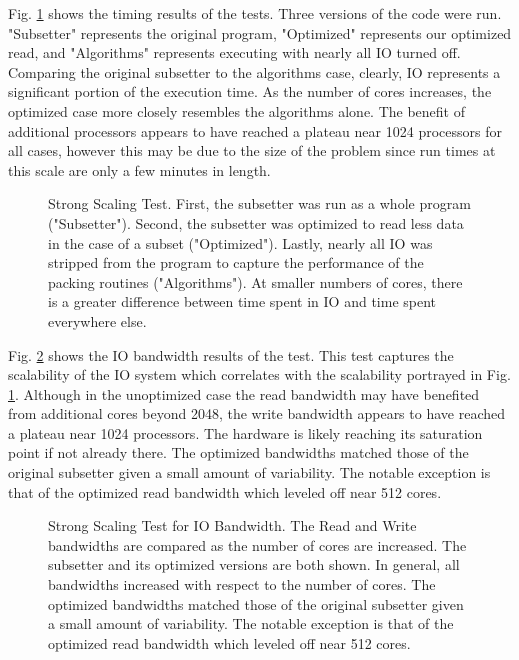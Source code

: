 Fig. \ref{fig:strong} shows the timing results of the tests.  Three versions
of the code were run.  "Subsetter" represents the original program,
"Optimized" represents our optimized read, and "Algorithms" represents
executing with nearly all IO turned off.  Comparing the original subsetter to
the algorithms case, clearly, IO represents a significant portion of the
execution time.  As the number of cores increases, the optimized case more
closely resembles the algorithms alone.  The benefit of additional processors
appears to have reached a plateau near 1024 processors for all cases, however
this may be due to the size of the problem since run times at this scale are
only a few minutes in length.

\begin{figure}[!t]
\center
\resizebox{3.5in}{!}{

}
\caption{Strong Scaling Test.  First, the subsetter was run as a whole
program ("Subsetter").  Second, the subsetter was optimized to read less data
in the case of a subset ("Optimized").  Lastly, nearly all IO was stripped
from the program to capture the performance of the packing routines
("Algorithms").  At smaller numbers of cores, there is a greater difference
between time spent in IO and time spent everywhere else.}
\label{fig:strong}
\end{figure}

Fig. \ref{fig:strong_io} shows the IO bandwidth results of the test.  This
test captures the scalability of the IO system which correlates with the
scalability portrayed in Fig. \ref{fig:strong}.  Although in the unoptimized
case the read bandwidth may have benefited from additional cores beyond 2048,
the write bandwidth appears to have reached a plateau near 1024 processors.
The hardware is likely reaching its saturation point if not already there.
The optimized bandwidths matched those of the original subsetter given a small
amount of variability.  The notable exception is that of the optimized read
bandwidth which leveled off near 512 cores.

\begin{figure}[!t]
\center
\resizebox{3.5in}{!}{

}
\caption{Strong Scaling Test for IO Bandwidth.  The Read and Write bandwidths
are compared as the number of cores are increased.  The subsetter and its
optimized versions are both shown.  In general, all bandwidths increased with
respect to the number of cores.  The optimized bandwidths matched those of the
original subsetter given a small amount of variability.  The notable exception
is that of the optimized read bandwidth which leveled off near 512 cores.}
\label{fig:strong_io}
\end{figure}

